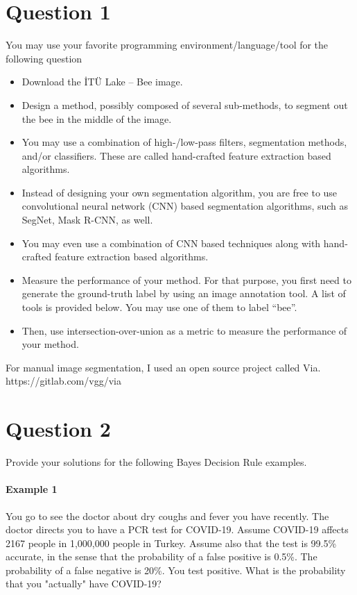 \documentclass[12pt]{article}
\begin{document}
\maketitle

\section{Question 1}\label{sec:q1}
You may use your favorite programming environment/language/tool for the following question
\begin{itemize}
    \item Download the İTÜ Lake – Bee image.
    \item Design a method, possibly composed of several sub-methods, to segment out the bee in the middle of the image.
    \item You may use a combination of high-/low-pass filters, segmentation methods, and/or classifiers. These are called hand-crafted feature extraction based algorithms.
    \item Instead of designing your own segmentation algorithm, you are free to use convolutional neural network (CNN) based segmentation algorithms, such as SegNet, Mask R-CNN, as well. 
    \item You may even use a combination of CNN based techniques along with hand-crafted feature extraction based algorithms. 
    \item Measure the performance of your method. For that purpose, you first need to generate the ground-truth label by using an image annotation tool. A list of tools is provided below. You may use one of them to label “bee”.  
    \item Then, use intersection-over-union as a metric to measure the performance of your method.
\end{itemize}


For manual image segmentation, I used an open source project called Via. https://gitlab.com/vgg/via

\pagebreak
\section{Question 2}\label{sec:q2}
Provide your solutions for the following Bayes Decision Rule examples.
\paragraph{Example 1}
You go to see the doctor about dry coughs and fever you have recently. The doctor directs you to have a PCR test for COVID-19.  Assume COVID-19 affects 2167 people in 1,000,000 people in Turkey. Assume also that the test is 99.5\% accurate, in the sense that the probability of a false positive is 0.5\%. The probability of a false negative is 20\%. You test positive. What is the probability that you "actually" have COVID-19?
\end{document}
